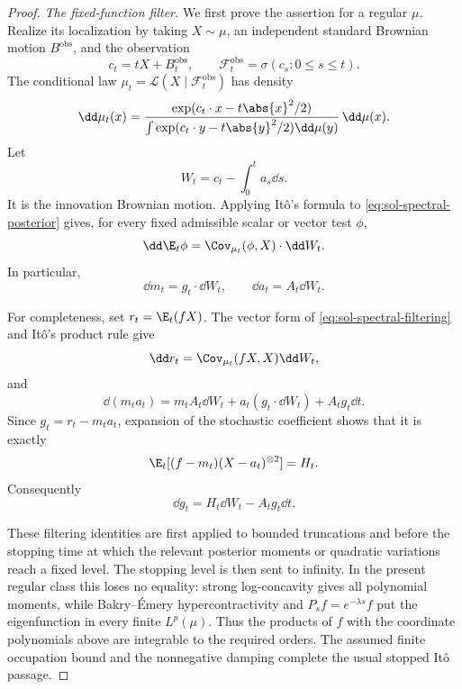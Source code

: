 \documentclass[../main.tex]{subfiles}
\begin{document}
\begin{proof}
\noindent\emph{The fixed-function filter.}
We first prove the assertion for a regular $\mu$.  Realize its localization by taking
$X\sim\mu$, an independent standard Brownian motion $B^{\mathrm{obs}}$, and the observation
\[
  c_t=tX+B_t^{\mathrm{obs}},
  \qquad
  \mathcal F_t^{\mathrm{obs}}=\sigma(c_s:0\le s\le t).
\]
The conditional law $\mu_t=\mathcal L(X\mid\mathcal F_t^{\mathrm{obs}})$ has density
\begin{equation}
  \dd\mu_t(x)=
  \frac{\exp(c_t\cdot x-t\abs{x}^2/2)}
       {\int\exp(c_t\cdot y-t\abs{y}^2/2)\dd\mu(y)}\,\dd\mu(x).
  \label{eq:sol-spectral-posterior}
\end{equation}
Let
\[
  W_t=c_t-\int_0^ta_s\dd s.
\]
It is the innovation Brownian motion.  Applying It\^o's formula to
\eqref{eq:sol-spectral-posterior} gives, for every fixed admissible scalar or vector test
$\phi$,
\begin{equation}
  \dd\E_t\phi=\Cov_{\mu_t}(\phi,X)\cdot\dd W_t.
  \label{eq:sol-spectral-filtering}
\end{equation}
In particular,
\[
  \dd m_t=g_t\cdot\dd W_t,
  \qquad
  \dd a_t=A_t\dd W_t.
\]

For completeness, set $r_t=\E_t(fX)$.  The vector form of
\eqref{eq:sol-spectral-filtering} and It\^o's product rule give
\[
  \dd r_t=\Cov_{\mu_t}(fX,X)\dd W_t,
\]
and
\[
  \dd(m_ta_t)=m_tA_t\dd W_t+a_t(g_t\cdot\dd W_t)+A_tg_t\dd t.
\]
Since $g_t=r_t-m_ta_t$, expansion of the stochastic coefficient shows that it is exactly
\[
  \E_t[(f-m_t)(X-a_t)^{\otimes2}]=H_t.
\]
Consequently
\begin{equation}
  \dd g_t=H_t\dd W_t-A_tg_t\dd t.
  \label{eq:sol-spectral-fixed-function-sde}
\end{equation}

These filtering identities are first applied to bounded truncations and before the stopping time
at which the relevant posterior moments or quadratic variations reach a fixed level.  The
stopping level is then sent to infinity.  In the present regular class this loses no equality:
strong log-concavity gives all polynomial moments, while Bakry--\'Emery hypercontractivity and
$P_sf=e^{-\lambda s}f$ put the eigenfunction in every finite $L^p(\mu)$.  Thus the products of
$f$ with the coordinate polynomials above are integrable to the required orders.  The assumed
finite occupation bound and the nonnegative damping complete the usual stopped It\^o passage.


\end{proof}
\end{document}
